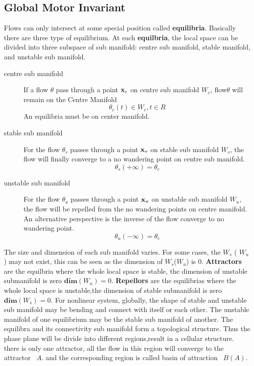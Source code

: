 \subsection{Global Motor Invariant}
Flows can only intersect at some special position called \textbf{equilibria}.
Basically there are three type of equilibrium.
At each \textbf{equilbria}, 
the local space can be divided into three subspace of sub manifold: centre sub manifold, stable manifold, and unstable sub manifold.
\begin{description} 
\item[centre sub manifold]
If a flow $\theta$ pass through a point $\mathbf{x}_{c}$ on centre sub manifold $W_{c}$,
flow$\theta$ will remain on the Centre Manifold 
\[
\theta_{c}(t) \in W_{c}, t \in R
\]
 An equilibria must be on center manifold. 
\item [stable sub manifold]
For the flow $\theta_{s}$ passes through a point $\mathbf{x}_{s}$ on stable sub manifold $W_{s}$, the flow will finally converge to a no wandering point on centre sub manifold.
\[
\theta_{s}(+\infty)=\theta_{c}
\]
\item[unstable sub manifold]
For the flow $\theta_u$ passes through a point $\mathbf{x}_u$ on unstable sub manifold $W_{u}$, the flow will be repelled from the no wandering points on centre manifold.
An alternative perspective is the inverse of the flow converge to no wandering point. 
\[
\theta_{u}(-\infty)=\theta_{c}
\] 

\end{description}

The size and dimension of each sub manifold varies.
For some cases, the $W_{s}$ ( $W_{u}$) may not exist, 
this can be seen as the dimension of $W_{s}$($W_{u}$) is $0$.
\textbf{Attractors} are the equilbria where the whole local space is stable, the dimension of unstable submanifold is zero $\mathbf{dim}(W_{u})=0$.
\textbf{Repellors} are the equilibrias where the whole local space is unstable,the dimension of stable submanifold is zero $\mathbf{dim}(W_{s})=0$.
For nonlinear system, globally, the shape of stable and unstable sub manifold may be bending and connect with itself or each other.
The unstable manifold of one equilibrium may be the stable sub manifold of another.
The equilibra and its connectivity sub manifold form a topological structure.
Thus the phase plane will be divide into different regions,result in a cellular structure.
there is only one attractor, all the flow in this region will converge to the attractor ~$A$.
and the corresponding region is called basin of attraction ~$B(A)$.

